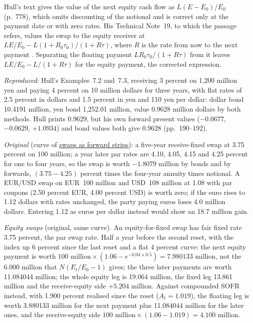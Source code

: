 \begin{qfmethod}
Hull's text gives the value of the next equity cash flow as $L(E-E_0)/E_0$ (p.~778), which omits discounting of the notional and is correct only at the payment date or with zero rates. His Technical Note~19, to which the passage refers, values the swap to the equity receiver at $LE/E_0-L(1+R_0\tau_0)/(1+R\tau)$, where $R$ is the rate from now to the next payment \citep[Technical Note~19]{hull-tn19}. Separating the floating payment $LR_0\tau_0/(1+R\tau)$ from it leaves $LE/E_0-L/(1+R\tau)$ for the equity payment, the corrected expression.

 \emph{Reproduced}: Hull's Examples~7.2 and~7.3, receiving 3 percent on 1{,}200 million yen and paying 4 percent on 10 million dollars for three years, with flat rates of 2.5 percent in dollars and 1.5 percent in yen and 110 yen per dollar: dollar bond 10.4191 million, yen bond 1{,}252.01 million, value 0.9628 million dollars by both methods. Hull prints 0.9629, but his own forward present values ($-0.0677$, $-0.0629$, $+1.0934$) and bond values both give 0.9628 (pp.~190--192).

\emph{Original} (curve of \hyperref[def:swaps-as-forward-strips]{swaps as forward strips}): a five-year receive-fixed swap at 3.75 percent on 100 million; a year later par rates are 4.10, 4.05, 4.15 and 4.25 percent for one to four years, so the swap is worth $-1.8079$ million by bonds and by forwards, $(3.75-4.25)$ percent times the four-year annuity times notional. A EUR/USD swap on EUR~100 million and USD~108 million at 1.08 with par coupons (2.50 percent EUR, 4.00 percent USD) is worth zero; if the euro rises to 1.12 dollars with rates unchanged, the party paying euros loses 4.0 million dollars. Entering 1.12 as euros per dollar instead would show an 18.7 million gain.

\emph{Equity swaps} (original, same curve). An equity-for-fixed swap has fair fixed rate 3.75 percent, the par swap rate. Half a year before the second reset, with the index up 6 percent since the last reset and a flat 4 percent curve: the next equity payment is worth $100\text{ million}\times(1.06-e^{-0.04\times0.5})=7.980133$ million, not the 6.000 million that $N(E_t/E_0-1)$ gives; the three later payments are worth 11.084044 million; the whole equity leg is 19.064 million, the fixed leg 13.861 million and the receive-equity side $+5.204$ million. Against compounded SOFR instead, with 1.900 percent realised since the reset ($A_t=1.019$), the floating leg is worth 3.880133 million for the next payment plus 11.084044 million for the later ones, and the receive-equity side $100\text{ million}\times(1.06-1.019)=4.100$ million.


\end{qfmethod}
